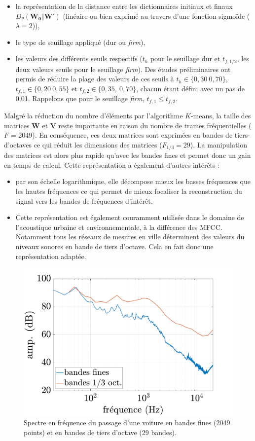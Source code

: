 \begin{itemize}
\item la représentation de la distance entre les dictionnaires initiaux et finaux $D_{\theta}(\mathbf{W_0}\Vert \mathbf{W'})$ (linéaire ou bien exprimé au travers d'une fonction sigmoïde ($\lambda = 2$)),
\item le type de seuillage appliqué (dur ou \textit{firm}),
\item les valeurs des différents seuils respectifs ($t_h$ pour le seuillage dur et $t_{f,1/2}$, les deux valeurs seuils pour le seuillage \textit{firm}). Des études préliminaires ont permis de réduire la plage des valeurs de ces seuils à $t_h \in \lbrace 0,30~0,70 \rbrace$, $t_{f,1} \in \lbrace 0,20~0,55 \rbrace$ et $t_{f,2} \in \lbrace 0,35,~0,70 \rbrace$, chacun étant défini avec un pas de 0,01. Rappelons que pour le seuillage \textit{firm}, $t_{f,1} \leq t_{f,2}$.
\end{itemize}

Malgré la réduction du nombre d'éléments par l'algorithme $K$-means, la taille des matrices $\mathbf{W}$ et $\mathbf{V}$ reste importante en raison du nombre de trames fréquentielles ($F$ = 2049). En conséquence, ces deux matrices sont exprimées en bandes de tiers-d'octaves ce qui réduit les dimensions des matrices ($F_{1/3} = 29$). La manipulation des matrices est alors plus rapide qu'avec les bandes fines et permet donc un gain en temps de calcul. Cette représentation a également d'autres intérêts :

\begin{itemize}
\item par son échelle logarithmique, elle décompose mieux les basses fréquences que les hautes fréquences ce qui permet de mieux focaliser la reconstruction du signal vers les bandes de fréquences d'intérêt.
\item Cette représentation est également couramment utilisée dans le domaine de l'acoustique urbaine et environnementale, à la différence des MFCC. Notamment tous les réseaux de mesures en ville déterminent des valeurs du niveaux sonores en bande de tiers d'octave. Cela en fait donc une représentation adaptée.
\end{itemize}

\begin{figure}[h]
\centering
\includegraphics[width=0.5\linewidth]{./figures/NMF/bande_fine_tiers.pdf}
\caption{Spectre en fréquence du passage d'une voiture en bandes fines (2049 points) et en bandes de tiers d'octave (29 bandes).}
\end{figure}

